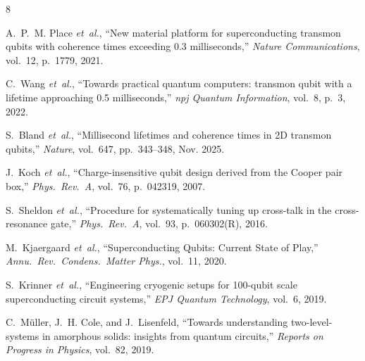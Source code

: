 \documentclass[conference]{IEEEtran}
\begin{document}

\begin{thebibliography}{8}

A.~P.~M. Place \emph{et~al.}, ``New material platform for superconducting transmon qubits with coherence times exceeding 0.3 milliseconds,'' \emph{Nature Communications}, vol.~12, p.~1779, 2021.

C.~Wang \emph{et~al.}, ``Towards practical quantum computers: transmon qubit with a lifetime approaching 0.5 milliseconds,'' \emph{npj Quantum Information}, vol.~8, p.~3, 2022.

S.~Bland \emph{et~al.}, ``Millisecond lifetimes and coherence times in 2D transmon qubits,'' \emph{Nature}, vol.~647, pp.~343--348, Nov. 2025.

J.~Koch \emph{et~al.}, ``Charge-insensitive qubit design derived from the Cooper pair box,'' \emph{Phys.\ Rev.\ A}, vol.~76, p.~042319, 2007.

S.~Sheldon \emph{et~al.}, ``Procedure for systematically tuning up cross-talk in the cross-resonance gate,'' \emph{Phys.\ Rev.\ A}, vol.~93, p.~060302(R), 2016.

M.~Kjaergaard \emph{et~al.}, ``Superconducting Qubits: Current State of Play,'' \emph{Annu.\ Rev.\ Condens.\ Matter Phys.}, vol.~11, 2020.

S.~Krinner \emph{et~al.}, ``Engineering cryogenic setups for 100-qubit scale superconducting circuit systems,'' \emph{EPJ Quantum Technology}, vol.~6, 2019.

C.~M\"uller, J.~H. Cole, and J.~Lisenfeld, ``Towards understanding two-level-systems in amorphous solids: insights from quantum circuits,'' \emph{Reports on Progress in Physics}, vol.~82, 2019.

\end{thebibliography}
\end{document}
